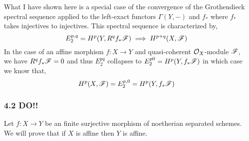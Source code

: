 \documentclass[12pt]{article}
\begin{document}
\begin{remark}
What I have shown here is a special case of the convergence of the Grothendieck spectral sequence applied to the left-exact functors $\Gamma(Y, -)$ and $f_*$ where $f_*$ takes injectives to injectives. This spectral sequence is characterized by,
\[ E^{p, q}_2 = H^p(Y, R^q f_* \mathscr{F}) \implies H^{p+q}(X, \mathscr{F}) \] 
In the case of an affine morphism $f : X \to Y$ and quasi-coherent $\mathcal{O}_{X}$-module $\mathscr{F}$, we have $R^q f_* \mathscr{F} = 0$ and thus $E^{pq}_2$ collapses to $E_2^{p0} = H^p(Y, f_* \mathscr{F})$ in which case we know that,
\[ H^p(X, \mathscr{F}) = E^{p, 0}_2 = H^p(Y, f_* \mathscr{F}) \]
\end{remark}

\subsubsection{4.2 DO!!}

Let $f : X \to Y$ be an finite surjective morphism of noetherian separated schemes. We will prove that if $X$ is affine then $Y$ is affine.
\end{document}
